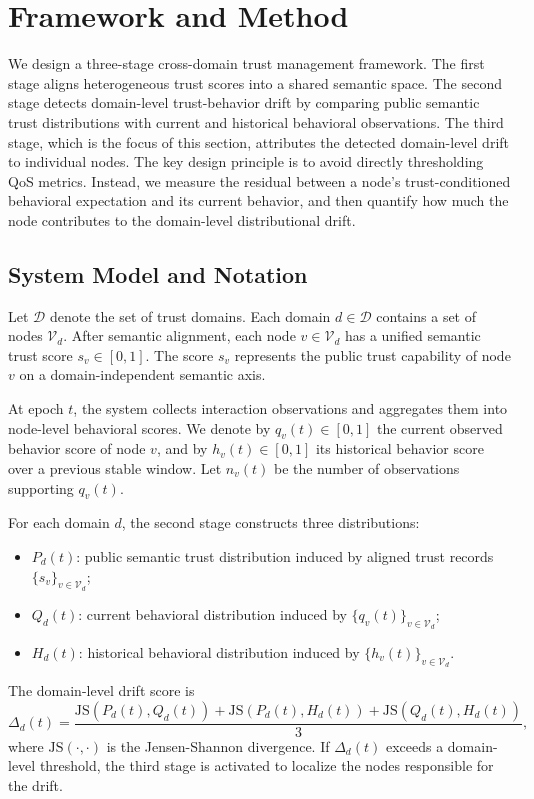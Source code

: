 \section{Framework and Method}
\label{sec:framework}

We design a three-stage cross-domain trust management framework.
The first stage aligns heterogeneous trust scores into a shared semantic
space. The second stage detects domain-level trust-behavior drift by
comparing public semantic trust distributions with current and historical
behavioral observations. The third stage, which is the focus of this
section, attributes the detected domain-level drift to individual nodes.
The key design principle is to avoid directly thresholding QoS metrics.
Instead, we measure the residual between a node's trust-conditioned
behavioral expectation and its current behavior, and then quantify how much
the node contributes to the domain-level distributional drift.

\subsection{System Model and Notation}
\label{sec:notation}

Let $\mathcal{D}$ denote the set of trust domains. Each domain
$d \in \mathcal{D}$ contains a set of nodes $\mathcal{V}_d$.
After semantic alignment, each node $v \in \mathcal{V}_d$ has a unified
semantic trust score $s_v \in [0,1]$. The score $s_v$ represents the
public trust capability of node $v$ on a domain-independent semantic axis.

At epoch $t$, the system collects interaction observations and aggregates
them into node-level behavioral scores. We denote by $q_v(t) \in [0,1]$
the current observed behavior score of node $v$, and by $h_v(t) \in [0,1]$
its historical behavior score over a previous stable window. Let $n_v(t)$
be the number of observations supporting $q_v(t)$.

For each domain $d$, the second stage constructs three distributions:
\begin{itemize}
    \item $P_d(t)$: public semantic trust distribution induced by aligned
    trust records $\{s_v\}_{v \in \mathcal{V}_d}$;
    \item $Q_d(t)$: current behavioral distribution induced by
    $\{q_v(t)\}_{v \in \mathcal{V}_d}$;
    \item $H_d(t)$: historical behavioral distribution induced by
    $\{h_v(t)\}_{v \in \mathcal{V}_d}$.
\end{itemize}
The domain-level drift score is
\begin{equation}
    \Delta_d(t) =
    \frac{
    \mathrm{JS}(P_d(t), Q_d(t)) +
    \mathrm{JS}(P_d(t), H_d(t)) +
    \mathrm{JS}(Q_d(t), H_d(t))
    }{3},
    \label{eq:domain-drift}
\end{equation}
where $\mathrm{JS}(\cdot,\cdot)$ is the Jensen-Shannon divergence.
If $\Delta_d(t)$ exceeds a domain-level threshold, the third stage is
activated to localize the nodes responsible for the drift.

